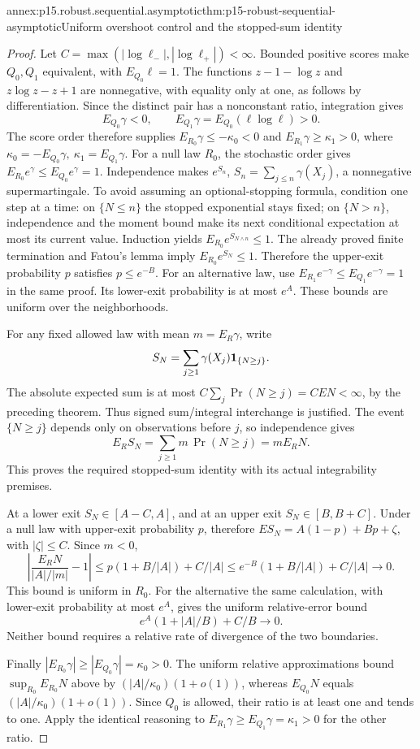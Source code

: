 \begin{annexitem}{annex:p15.robust.sequential.asymptotic}{thm:p15-robust-sequential-asymptotic}{Uniform overshoot control and the stopped-sum identity}
\begin{proof}
Let \(C=\max(|\log\ell_-|,|\log\ell_+|)<\infty\).
Bounded positive scores make \(Q_0,Q_1\) equivalent, with
\(E_{Q_0}\ell=1\). The functions \(z-1-\log z\) and
\(z\log z-z+1\) are nonnegative, with equality only at one,
as follows by differentiation. Since the distinct pair has a
nonconstant ratio, integration gives
\[
 E_{Q_0}\gamma<0,\qquad
 E_{Q_1}\gamma=E_{Q_0}(\ell\log\ell)>0.
\]
The score order therefore supplies
\(E_{R_0}\gamma\leq-\kappa_0<0\) and
\(E_{R_1}\gamma\geq\kappa_1>0\), where
\(\kappa_0=-E_{Q_0}\gamma,\ \kappa_1=E_{Q_1}\gamma\).
For a null law \(R_0\), the stochastic order gives
\(E_{R_0}e^\gamma\leq E_{Q_0}e^\gamma=1\).
Independence makes \(e^{S_n}\), \(S_n=\sum_{j\leq n}\gamma(X_j)\),
a nonnegative supermartingale. To avoid assuming an optional-stopping
formula, condition one step at a time: on \(\{N\leq n\}\) the
stopped exponential stays fixed; on \(\{N>n\}\), independence and
the moment bound make its next conditional expectation at most
its current value. Induction yields
\(E_{R_0}e^{S_{N\wedge n}}\leq1\).
The already proved finite termination and Fatou's lemma imply
\(E_{R_0}e^{S_N}\leq1\). Therefore the upper-exit probability \(p\)
satisfies \(p\leq e^{-B}\).
For an alternative law, use
\(E_{R_1}e^{-\gamma}\leq E_{Q_1}e^{-\gamma}=1\) in the same proof.
Its lower-exit probability is at most \(e^A\).
These bounds are uniform over the neighborhoods.

For any fixed allowed law with mean \(m=E_R\gamma\), write
\[
 S_N=\sum_{j\geq1}\gamma(X_j){\bf1}_{\{N\geq j\}}.
\]
The absolute expected sum is at most
\(C\sum_j\Pr(N\geq j)=CEN<\infty\), by the preceding theorem.
Thus signed sum/integral interchange is justified.
The event \(\{N\geq j\}\) depends only on observations before \(j\),
so independence gives
\[
 E_RS_N=\sum_{j\geq1}m\,\Pr(N\geq j)=mE_RN.
\]
This proves the required stopped-sum identity with its actual
integrability premises.

At a lower exit \(S_N\in[A-C,A]\), and at an upper exit
\(S_N\in[B,B+C]\). Under a null law with upper-exit probability \(p\),
therefore
\(E S_N=A(1-p)+Bp+\zeta\), with \(|\zeta|\leq C\).
Since \(m<0\),
\[
 \left|\frac{E_RN}{|A|/|m|}-1\right|
 \leq p(1+B/|A|)+C/|A|
 \leq e^{-B}(1+B/|A|)+C/|A|\longrightarrow0.
\]
This bound is uniform in \(R_0\).
For the alternative the same calculation, with lower-exit probability
at most \(e^A\), gives the uniform relative-error bound
\[
 e^A(1+|A|/B)+C/B\longrightarrow0.
\]
Neither bound requires a relative rate of divergence of the two
boundaries.

Finally \(|E_{R_0}\gamma|\geq|E_{Q_0}\gamma|=\kappa_0>0\).
The uniform relative approximations bound
\(\sup_{R_0}E_{R_0}N\) above by
\((|A|/\kappa_0)(1+o(1))\), whereas \(E_{Q_0}N\) equals
\((|A|/\kappa_0)(1+o(1))\). Since \(Q_0\) is allowed, their ratio
is at least one and tends to one. Apply the identical reasoning to
\(E_{R_1}\gamma\geq E_{Q_1}\gamma=\kappa_1>0\) for the other ratio.
\end{proof}
\end{annexitem}
